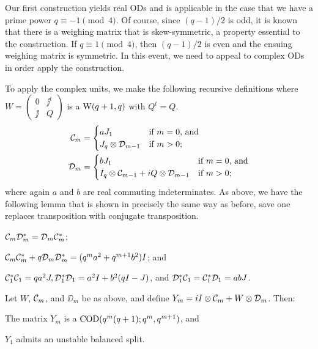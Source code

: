 \documentclass[../../../main]{subfiles}
\begin{document}
Our first construction yields real ODs and is applicable in the case that we
have a prime power $q \equiv -1 \pmod{4}$. Of course, since $(q-1)/2$ is odd, it
is known \cite[see][]{combinatorics-of-symmetric-designs} that there is a weighing matrix that is skew-symmetric, a property essential to the construction. If $q \equiv 1 \pmod{4}$, then $(q-1)/2$ is even and the ensuing weighing matrix is symmetric. In this event, we need to appeal to complex ODs in order apply the construction.

To apply the complex units, we make the following recursive definitions where $W=\left(\begin{smallmatrix} 0 & \jj^t \\ \jj & Q \end{smallmatrix}\right)$ is a $\text{W}(q+1,q)$ with $Q^t=Q$.
\begin{align*}
 \mathcal{C}_m&=\begin{cases}
        aJ_1 & \text{if $m=0$, and} \\
        J_q \otimes \mathcal{D}_{m-1} & \text{if $m>0$;}
       \end{cases}\\
 \mathcal{D}_m&=\begin{cases}
        bJ_1 & \text{if $m=0$, and} \\
        I_q \otimes \mathcal{C}_{m-1} + iQ \otimes \mathcal{D}_{m-1} & \text{if $m>0$;}
       \end{cases}
\end{align*}
where again $a$ and $b$ are real commuting indeterminates. As above, we have the following lemma that is shown in precisely the same way as before, save one replaces transposition with conjugate transposition.

\begin{lem}
  \begin{defenum}
  \item[]
  \item $\mathcal{C}_m\mathcal{D}_m^* = \mathcal{D}_m\mathcal{C}_m^*$;
  \item $\mathcal{C}_m\mathcal{C}_m^* + q\mathcal{D}_m\mathcal{D}_m^* = (q^ma^2+q^{m+1}b^2)I$; and
  \item $\mathcal{C}_1^*\mathcal{C}_1 = qa^2J, \mathcal{D}_1^*\mathcal{D}_1=a^2I+b^2(qI-J)$, and $\mathcal{D}_1^*\mathcal{C}_1=\mathcal{C}_1^*\mathcal{D}_1=abJ$.
 \end{defenum}
\end{lem}

\begin{thm}
 Let $W$, $\mathcal{C}_m$, and $\DD_m$ be as above, and define $Y_m=iI \otimes \mathcal{C}_m + W \otimes \mathcal{D}_m$. Then:
 \begin{defenum}
  \item The matrix $Y_m$ is a $\text{COD}(q^m(q+1); q^m, q^{m+1})$, and
  \item $Y_1$ admits an unstable balanced split.
 \end{defenum}
\end{thm}
\end{document}
